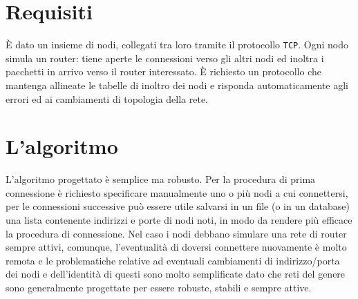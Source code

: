 \documentclass[10pt]{article} %
\begin{document}
\begin{abstract}
Scopo del progetto è l'elaborazione di un algoritmo che permetta ad un insieme di nodi di connettersi via {\tt TCP} e gestire la rete senza l'ausilio di un server. Date le grandi affinità con la struttura dei router, il protocollo elaborato è stato chiamato {\tt PRP}, ovvero Peer-to-Peer Routing Protocol.\\
Date le complessità di implementazione, la soluzione proposta nel codice è necessariamente incompleta. Gli scopi di questa relazione sono:
\begin{enumerate}
	\item mostrare l'architettura di rete risultante dall'utilizzo dell'algoritmo e metterne in evidenza alcune proprietà;
	\item illustrare il funzionamento dell'algoritmo;
	\item discutere dei miglioramenti che possono essere apportati all'algoritmo.
\end{enumerate}
Notare che, anche se l'applicativo di esempio sopra modellato è una semplice chat, il protocollo può essere utilizzato anche per altri scopi, quali ad esempio:
\begin{enumerate}
	\item trasferimento di file;
	\item mail service;
	\item {\tt VoIP}.
\end{enumerate}
\end{abstract}

\section{Requisiti}
\`E dato un insieme di nodi, collegati tra loro tramite il protocollo {\tt TCP}. Ogni nodo simula un router: tiene aperte le connessioni verso gli altri nodi ed inoltra i pacchetti in arrivo verso il router interessato. \`E richiesto un protocollo che mantenga allineate le tabelle di inoltro dei nodi e risponda automaticamente agli errori ed ai cambiamenti di topologia della rete.

\section{L'algoritmo}
L'algoritmo progettato è semplice ma robusto. Per la procedura di prima connessione è richiesto specificare manualmente uno o più nodi a cui connettersi, per le connessioni successive può essere utile salvarsi in un file (o in un database) una lista contenente indirizzi e porte di nodi noti, in modo da rendere più efficace la procedura di connessione. Nel caso i nodi debbano simulare una rete di router sempre attivi, comunque, l'eventualità di doversi connettere nuovamente è molto remota e le problematiche relative ad eventuali cambiamenti di indirizzo/porta dei nodi e dell'identità di questi sono molto semplificate dato che reti del genere sono generalmente progettate per essere robuste, stabili e sempre attive.
\end{document}
